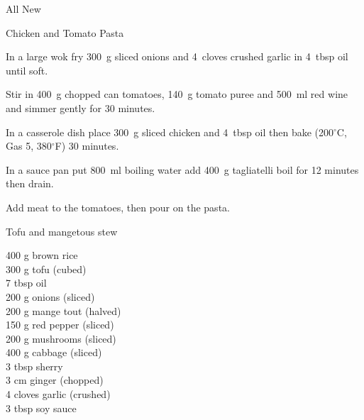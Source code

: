 \begin{menu}{All New}
\begin{recipe}{2}{Chicken and Tomato Pasta}
\begin{ingredients}
		\end{ingredients}
	
    \begin{instructions}
    \item 
        In a large wok fry
        300~g sliced onions
        and
        4~cloves crushed garlic
        in
        4~tbsp  oil
        until soft.
      \item 
        Stir in
        400~g chopped can tomatoes,
        140~g  tomato puree
        and
        500~ml  red wine
        and simmer gently for 30 minutes.
      \item 
        In a casserole dish place
        300~g sliced chicken
        and
        4~tbsp  oil
        then bake 
      (200$^{\circ}$C, Gas 5, 380$^{\circ}$F)
     30 minutes.
      \item 
      In a
      sauce pan
      put
      800~ml  boiling water
      add
      400~g  tagliatelli
      boil for 12 minutes then drain.
    \item 
        Add meat to the tomatoes, then pour on the pasta.
      
    \end{instructions}
    \end{recipe}%
  
    \begin{recipe}{2}{Tofu and mangetous stew}%
    
		\begin{ingredients}
		400 g brown rice  \\
	300 g tofu (cubed) \\
	7 tbsp oil  \\
	200 g onions (sliced) \\
	200 g mange tout (halved) \\
	150 g red pepper (sliced) \\
	200 g mushrooms (sliced) \\
	400 g cabbage (sliced) \\
	3 tbsp sherry  \\
	3 cm ginger (chopped) \\
	4 cloves garlic (crushed) \\
	3 tbsp soy sauce  \\
	
		\end{ingredients}
	
	

\end{recipe}
\end{menu}
